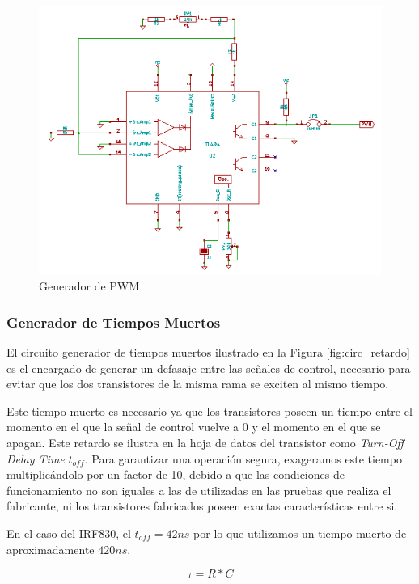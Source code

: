 \documentclass[11pt, a4paper]{article}
\begin{document}
\begin{figure}[h]
	\centering
	\includegraphics[width=13cm]{Imagenes/circ_pwm.png}
	\caption{Generador de PWM}
	\label{fig:circ_pwm}
\end{figure} 

\subsubsection{Generador de Tiempos Muertos}

El circuito generador de tiempos muertos ilustrado en la Figura \ref{fig:circ_retardo} es el encargado de generar un defasaje entre las señales de control, necesario para evitar que los dos transistores de la misma rama se exciten al mismo tiempo. 

Este tiempo muerto es necesario ya que los transistores poseen un tiempo entre el momento en el que la señal de control vuelve a 0 y el momento en el que se apagan. Este retardo se ilustra en la hoja de datos del transistor como \textit{Turn-Off Delay Time} $t_{off}$. Para garantizar una operación segura, exageramos este tiempo multiplicándolo por un factor de 10, debido a que las condiciones de funcionamiento no son iguales a las de utilizadas en las pruebas que realiza el fabricante, ni los transistores fabricados poseen exactas características entre si.

En el caso del IRF830, el $t_{off} = 42 ns$ por lo que utilizamos un tiempo muerto de aproximadamente $420ns$. 

\begin{equation}
\tau = R * C
\end{equation}
\end{document}
